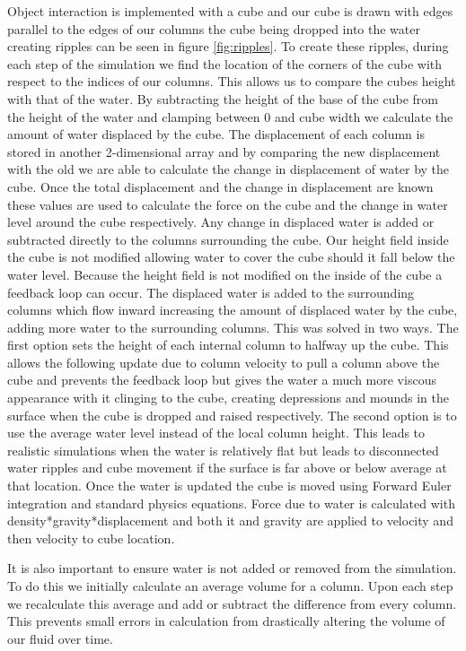\documentclass[12pt,notitlepage]{article}
\begin{document}
Object interaction is implemented with a cube and our cube is drawn with edges 
parallel to the edges of our columns the cube being dropped into the water 
creating ripples can be seen in figure \ref{fig:ripples}.  To create these 
ripples, during each step of 
the simulation we 
find the location of the corners of the cube with respect to the indices of our 
columns.  This allows us to compare the cubes height with that of the water.  
By subtracting the height of the base of the cube from the height of the water 
and clamping between 0 and cube width we calculate the amount of water 
displaced by the cube.  The displacement of each column is stored in another 
2-dimensional array and by comparing the new displacement with the old we are 
able to calculate the change in displacement of water by the cube.  Once the 
total displacement and the change in displacement are known these values are 
used to calculate the force on the cube and the change in water level around 
the cube respectively.  Any change in displaced water is added or subtracted 
directly to the columns surrounding the cube.  Our height field inside the cube 
is not modified allowing water to cover the cube should it fall below the water 
level.  Because the height field is not modified on the inside of the cube a 
feedback loop can occur.  The displaced water is added to the surrounding 
columns which flow inward increasing the amount of displaced water by the cube, 
adding more water to the surrounding columns.  This was solved in two ways.  
The first option sets the height of each internal column to halfway up the 
cube.  This allows the following update due to column velocity to pull a column 
above the cube and prevents the feedback loop but gives the water a much more 
viscous appearance with it clinging to the cube, creating depressions and 
mounds in the surface when the cube is dropped and raised respectively.  The 
second option is to use the average water level instead of the local column 
height.  This leads to realistic simulations when the water is relatively flat 
but leads to disconnected water ripples and cube movement if the surface is far 
above or below average at that location.  Once the water is updated the cube is 
moved using Forward Euler integration and standard physics equations.  Force 
due to water is calculated with density*gravity*displacement and both it and 
gravity are applied to velocity and then velocity to cube location.

It is also important to ensure water is not added or removed from the simulation.  To do this we initially calculate an average volume for a column.  Upon each step we recalculate this average and add or subtract the difference from every column.  This prevents small errors in calculation from drastically altering the volume of our fluid over time.
\end{document}

